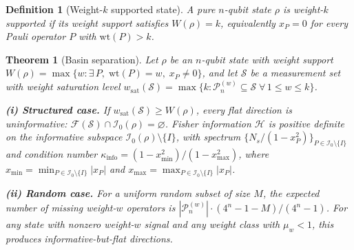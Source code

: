 \documentclass[twocolumn,prx,aps,superscriptaddress,longbibliography,floatfix]{revtex4-2}
\newtheorem{theorem}{Theorem}
\newtheorem{definition}{Definition}
\newcommand{\pclaim}[4]{}
\begin{document}
\begin{definition}[Weight-$k$ supported state]
\label{def:weight-k-supported}
A pure $n$-qubit state $\rho$ is \emph{weight-$k$ supported}
if its weight support satisfies $W(\rho) = k$, equivalently
$x_P = 0$ for every Pauli operator $P$ with
$\mathrm{wt}(P) > k$.
\end{definition}

\pclaim{env:thm:basin}{proved}{*}{thm:basin}%
\begin{theorem}[Basin separation]
\label{thm:basin}
Let $\rho$ be an $n$-qubit state with weight support
$W(\rho) = \max\{w : \exists\, P,\; \mathrm{wt}(P) = w,\;
x_P \neq 0\}$, and let $\mathcal{S}$ be a measurement set with weight
saturation level
$w_{\mathrm{sat}}(\mathcal{S}) = \max\{k : \mathcal{P}_n^{(w)} \subseteq \mathcal{S}
\;\forall\, 1 \le w \le k\}$.

\medskip\noindent
\textbf{(i) Structured case.}
If\/ $w_{\mathrm{sat}}(\mathcal{S}) \ge W(\rho)$, every flat direction is
uninformative:
$\mathcal{F}(\mathcal{S}) \cap \mathcal{I}_0(\rho) = \varnothing$.
Fisher information $\mathcal{H}$ is positive definite on
the informative subspace $\mathcal{I}_0(\rho) \setminus \{I\}$, with spectrum
$\{N_s/(1 - x_P^2)\}_{P \in \mathcal{I}_0 \setminus \{I\}}$ and condition number
$\kappa_{\mathrm{info}} = (1{-}x_{\min}^2)/(1{-}x_{\max}^2)$,
where $x_{\min} = \min_{P \in \mathcal{I}_0 \setminus \{I\}} |x_P|$
and $x_{\max} = \max_{P \in \mathcal{I}_0 \setminus \{I\}} |x_P|$.

\medskip\noindent
\textbf{(ii) Random case.}
For a uniform random subset of size $M$, the expected number of
missing weight-$w$ operators is
$|\mathcal{P}_n^{(w)}| \cdot (4^n{-}1{-}M)/(4^n{-}1)$.
For any state with nonzero weight-$w$ signal and any
weight class with $\mu_w < 1$, this produces
informative-but-flat directions.


\end{theorem}
\end{document}
